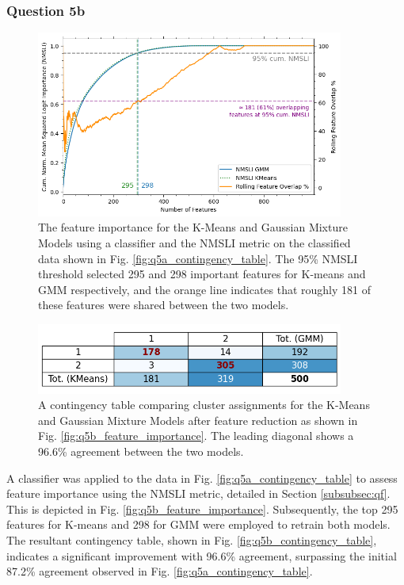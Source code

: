 \subsubsection{Question 5b}\label{subsubsec:q5b}
    \begin{figure}[htb]
    \centering
    \includegraphics[width=0.9\textwidth]{./figures/q5b_feature_importance}
    \caption{The feature importance for the K-Means and Gaussian Mixture Models using a 
        classifier and the NMSLI metric on the classified data shown in Fig. \eqref{fig:q5a_contingency_table}.
        The 95\% NMSLI threshold selected 295 and 298 important features for K-means and GMM respectively, and the
        orange line indicates that roughly 181 of these features were shared between the two models.}
    \label{fig:q5b_feature_importance}
    \end{figure}

    \begin{figure}[htb]
    \centering
    \includegraphics[width=0.9\textwidth]{./figures/q5b_contingency_table}
    \caption{A contingency table comparing cluster assignments for the K-Means and Gaussian Mixture Models after feature
        reduction as shown in Fig. \eqref{fig:q5b_feature_importance}. The leading diagonal shows a 96.6\% agreement
        between the two models.}
    \label{fig:q5b_contingency_table}
    \end{figure}

    A  classifier was applied to the data in Fig. \eqref{fig:q5a_contingency_table} to
    assess feature importance using the NMSLI metric, detailed in Section \eqref{subsubsec:qf}.
    This is depicted in Fig. \eqref{fig:q5b_feature_importance}.
    Subsequently, the top 295 features for K-means and 298 for GMM were employed to retrain both models.
    The resultant contingency table, shown in Fig. \eqref{fig:q5b_contingency_table}, indicates a significant improvement
    with 96.6\% agreement, surpassing the initial 87.2\% agreement observed in Fig. \eqref{fig:q5a_contingency_table}.

